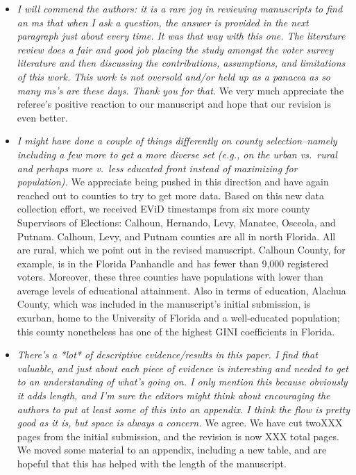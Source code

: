 \documentclass[12pt]{article}
\begin{document}
\begin{itemize}

\item \emph{I will commend the authors: it is a rare joy in reviewing
    manuscripts to find an ms that when I ask a question, the answer
    is provided in the next paragraph just about every time. It was
    that way with this one. The literature review does a fair and good
    job placing the study amongst the voter survey literature and then
    discussing the contributions, assumptions, and limitations of this
    work. This work is not oversold and/or held up as a panacea as so
    many ms's are these days. Thank you for that.}  We very much
  appreciate the referee's positive reaction to our manuscript and
  hope that our revision is even better.

\item \emph{I might have done a couple of things differently on county
    selection--namely including a few more to get a more diverse set
    (e.g., on the urban vs.\ rural and perhaps more v.\ less educated
    front instead of maximizing for population).}  We appreciate being
  pushed in this direction and have again reached out to counties to
  try to get more data.  Based on this new data collection effort, we
  received EViD timestamps from six more county Supervisors of
  Elections: Calhoun, Hernando, Levy, Manatee, Osceola, and Putnam.
  Calhoun, Levy, and Putnam counties are all in north Florida. All are
  rural, which we point out in the revised manuscript. Calhoun County,
  for example, is in the Florida Panhandle and has fewer than 9,000
  registered voters.  Moreover, these three counties have populations
  with lower than average levels of educational attainment.  Also in
  terms of education, Alachua County, which was included in the
  manuscript's initial submission, is exurban, home to the University
  of Florida and a well-educated population; this county nonetheless
  has one of the highest GINI coefficients in Florida.

\item \emph{There's a *lot* of descriptive evidence/results in this
    paper. I find that valuable, and just about each piece of evidence
    is interesting and needed to get to an understanding of what's
    going on. I only mention this because obviously it adds length,
    and I'm sure the editors might think about encouraging the authors
    to put at least some of this into an appendix. I think the flow is
    pretty good as it is, but space is always a concern.}  We agree.
  We have cut twoXXX pages from the initial submission, and the
  revision is now XXX total pages.  We moved some material to an
  appendix, including a new table, and are hopeful that this has
  helped with the length of the manuscript.


\end{itemize}
\end{document}
